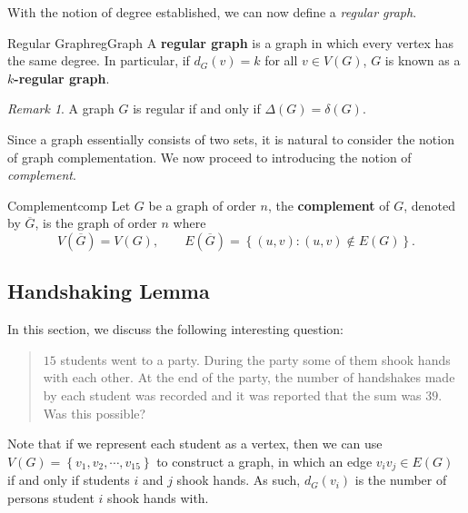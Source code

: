 \documentclass[math, code]{amznotes}
\theoremstyle{remark}
\newtheorem*{remark}{Remark}
\begin{document}
With the notion of degree established, we can now define a \textit{regular graph}.
\begin{dfnbox}{Regular Graph}{regGraph}
    A {\color{red} \textbf{regular graph}} is a graph in which every vertex has the same degree. In particular, if $d_G(v) = k$ for all $v \in V(G)$, $G$ is known as a {\color{red} \textbf{$k$-regular graph}}.
\end{dfnbox}
\begin{notebox}
    \begin{remark}
        A graph $G$ is regular if and only if $\Delta(G) = \delta(G)$.
    \end{remark}
\end{notebox}
Since a graph essentially consists of two sets, it is natural to consider the notion of graph complementation. We now proceed to introducing the notion of \textit{complement}.
\begin{dfnbox}{Complement}{comp}
    Let $G$ be a graph of order $n$, the {\color{red} \textbf{complement}} of $G$, denoted by $\overline{G}$, is the graph of order $n$ where
    \begin{equation*}
        V\left(\overline{G}\right) = V(G), \qquad E\left(\overline{G}\right) = \left\{(u, v) \colon (u, v) \notin E(G)\right\}.
    \end{equation*}
\end{dfnbox}
\subsection{Handshaking Lemma}
In this section, we discuss the following interesting question:
\begin{quote}
    $15$ students went to a party. During the party some of them shook hands with each other. At the end of the party, the number of handshakes made by each student was recorded and it was reported that the sum was $39$. Was this possible?
\end{quote}
Note that if we represent each student as a vertex, then we can use $V(G) = \left\{v_1, v_2, \cdots, v_{15}\right\}$ to construct a graph, in which an edge $v_iv_j \in E(G)$ if and only if students $i$ and $j$ shook hands. As such, $d_G(v_i)$ is the number of persons student $i$ shook hands with.
\end{document}
